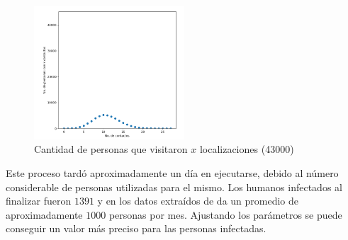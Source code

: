 \newpage
\begin{figure}[htb]
    \centering
    \includegraphics[width=0.5\textwidth]{Graphics/Contactos_per_43000.png}
    \caption{Cantidad de personas que visitaron $x$ localizaciones (43000)}
\end{figure}
\newpage
Este proceso tardó aproximadamente un día en ejecutarse, debido al número considerable de personas
utilizadas para el mismo. Los humanos infectados al finalizar fueron $1391$ y en los datos extraídos
de \autocite{Massón2015} da un promedio de aproximadamente $1000$ personas por mes. Ajustando los 
parámetros se puede conseguir un valor más preciso para las personas infectadas.